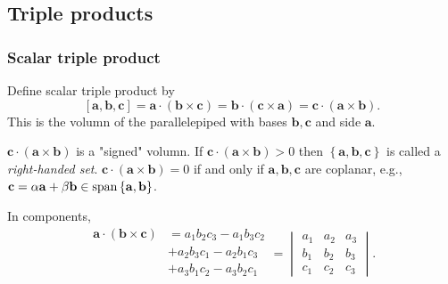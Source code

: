 \documentclass[a4paper]{article}
\begin{document}
\subsection{Triple products}
\subsubsection{Scalar triple product}
\begin{definition}
  Define scalar triple product by
  \[
    [\mathbf{a},\mathbf{b},\mathbf{c}]=\mathbf{a}\cdot (\mathbf{b}
    \times \mathbf{c})=\mathbf{b}\cdot (\mathbf{c} \times
    \mathbf{a})=\mathbf{c}\cdot (\mathbf{a}\times \mathbf{b})
  .\]
  This is the volumn of the parallelepiped with bases $ \mathbf{b},
  \mathbf{c} $ and side $ \mathbf{a} .$
\end{definition}
\begin{remark}
  $ \mathbf{c}\cdot (\mathbf{a}\times \mathbf{b}) $ is a "signed"
  volumn. If $ \mathbf{c}\cdot (\mathbf{a}\times \mathbf{b})>0 $ then
  $ \left\{ \mathbf{a},\mathbf{b},\mathbf{c}\right\} $ is called a
  \textit{right-handed set}. $ \mathbf{c}\cdot (\mathbf{a}\times
  \mathbf{b})=0 $ if and only if $ \mathbf{a},\mathbf{b},\mathbf{c} $
  are coplanar, e.g., $ \mathbf{c}=\alpha \mathbf{a}+\beta \mathbf{b}
  \in \operatorname{span}\left\{ \mathbf{a},\mathbf{b}\right\}$.
\end{remark}
In components,
\[
  \begin{aligned}
    \mathbf{a}\cdot (\mathbf{b}\times \mathbf{c})&=a_1b_2c_3-a_1b_3c_2 \\
    &+a_2b_3c_1-a_2b_1c_3\\
    &+a_3b_1c_2-a_3b_2c_1\\
  \end{aligned} =
  \begin{vmatrix}
    a_{1} & a_{2} & a_{3} \\
    b_{1} & b_{2} & b_{3} \\
    c_{1} & c_{2} & c_{3}
  \end{vmatrix}.
\]
\end{document}
